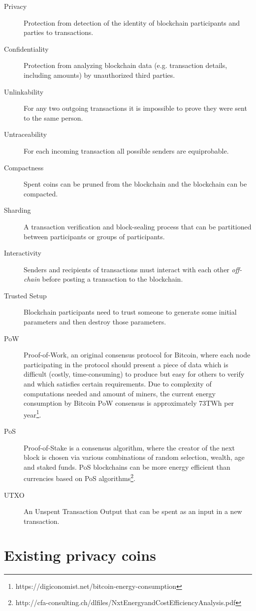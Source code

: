\documentclass[8pt,fleqn,openany]{book}
\begin{document}
\begin{description}
  \item[Privacy] Protection from detection of the identity of blockchain participants and parties to transactions.
  \item[Confidentiality] Protection from analyzing blockchain data (e.g. transaction details, including amounts) by unauthorized third parties.
  \item[Unlinkability] For any two outgoing transactions it is impossible to prove they were sent to the same person\cite{c2}.
  \item[Untraceability] For each incoming transaction all possible senders are equiprobable\cite{c2}.
  \item[Compactness] Spent coins can be pruned from the blockchain and the blockchain can be compacted.
  \item[Sharding] A transaction verification and block-sealing process that can be partitioned between participants or groups of participants.
  \item[Interactivity] Senders and recipients of transactions must interact with each other \textit{off-chain} before posting a transaction to the blockchain.
  \item[Trusted Setup] Blockchain participants need to trust someone to generate some initial parameters and then destroy those parameters.
  \item[PoW] Proof-of-Work, an original consensus protocol for Bitcoin, where each node participating in the protocol should present a piece of data which is difficult (costly, time-consuming) to produce but easy for others to verify and which satisfies certain requirements. Due to complexity of computations needed and amount of miners, the current energy consumption by Bitcoin PoW consensus is approximately 73TWh per year\footnote{https://digiconomist.net/bitcoin-energy-consumption}.
  \item[PoS] Proof-of-Stake is a consensus algorithm, where the creator of the next block is chosen via various combinations of random selection, wealth, age and staked funds. PoS blockchains can be more energy efficient than currencies based on PoS algorithms\footnote{http://cfa-consulting.ch/dlfiles/NxtEnergyandCostEfficiencyAnalysis.pdf}.
  \item[UTXO] An Unspent Transaction Output that can be spent as an input in a new transaction.
\end{description}

\section{Existing privacy coins}
\end{document}
